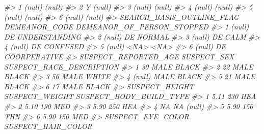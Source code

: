 \documentclass[
]{krantz}
\makeatletter
\newenvironment{Shaded}{\begin{snugshade}}{\end{snugshade}}
\newcommand{\CommentTok}[1]{\textcolor[rgb]{0.37,0.37,0.37}{\textit{#1}}}
\newenvironment{kframe}{%
\medskip{}
\setlength{\fboxsep}{.8em}
 \def\at@end@of@kframe{}%
 \ifinner\ifhmode%
  \def\at@end@of@kframe{\end{minipage}}%
  \begin{minipage}{\columnwidth}%
 \fi\fi%
 \def\FrameCommand##1{\hskip\@totalleftmargin \hskip-\fboxsep
 \colorbox{shadecolor}{##1}\hskip-\fboxsep
     \hskip-\linewidth \hskip-\@totalleftmargin \hskip\columnwidth}%
 \MakeFramed {\advance\hsize-\width
   \@totalleftmargin\z@ \linewidth\hsize
   \@setminipage}}%
 {\par\unskip\endMakeFramed%
 \at@end@of@kframe}
\renewenvironment{Shaded}{\begin{kframe}}{\end{kframe}}
\makeatother
\begin{document}
\begin{Shaded}
\begin{Highlighting}[]
\CommentTok{\#\textgreater{} 1                                 (null)                  (null)}
\CommentTok{\#\textgreater{} 2                                      Y                  (null)}
\CommentTok{\#\textgreater{} 3                                 (null)                  (null)}
\CommentTok{\#\textgreater{} 4                                 (null)                  (null)}
\CommentTok{\#\textgreater{} 5                                 (null)                  (null)}
\CommentTok{\#\textgreater{} 6                                 (null)                  (null)}
\CommentTok{\#\textgreater{}   SEARCH\_BASIS\_OUTLINE\_FLAG DEMEANOR\_CODE DEMEANOR\_OF\_PERSON\_STOPPED}
\CommentTok{\#\textgreater{} 1                    (null)            DE              UNDERSTANDING}
\CommentTok{\#\textgreater{} 2                    (null)            DE                     NORMAL}
\CommentTok{\#\textgreater{} 3                    (null)            DE                       CALM}
\CommentTok{\#\textgreater{} 4                    (null)            DE                   CONFUSED}
\CommentTok{\#\textgreater{} 5                    (null)          \textless{}NA\textgreater{}                       \textless{}NA\textgreater{}}
\CommentTok{\#\textgreater{} 6                    (null)            DE               COORPERATIVE}
\CommentTok{\#\textgreater{}   SUSPECT\_REPORTED\_AGE SUSPECT\_SEX SUSPECT\_RACE\_DESCRIPTION}
\CommentTok{\#\textgreater{} 1                   30        MALE                    BLACK}
\CommentTok{\#\textgreater{} 2                   22        MALE                    BLACK}
\CommentTok{\#\textgreater{} 3                   56        MALE                    WHITE}
\CommentTok{\#\textgreater{} 4               (null)        MALE                    BLACK}
\CommentTok{\#\textgreater{} 5                   21        MALE                    BLACK}
\CommentTok{\#\textgreater{} 6                   17        MALE                    BLACK}
\CommentTok{\#\textgreater{}   SUSPECT\_HEIGHT SUSPECT\_WEIGHT SUSPECT\_BODY\_BUILD\_TYPE}
\CommentTok{\#\textgreater{} 1           5.11            230                     HEA}
\CommentTok{\#\textgreater{} 2           5.10            190                     MED}
\CommentTok{\#\textgreater{} 3           5.90            250                     HEA}
\CommentTok{\#\textgreater{} 4             NA             NA                  (null)}
\CommentTok{\#\textgreater{} 5           5.90            150                     THN}
\CommentTok{\#\textgreater{} 6           5.90            150                     MED}
\CommentTok{\#\textgreater{}   SUSPECT\_EYE\_COLOR SUSPECT\_HAIR\_COLOR}

\end{Highlighting}
\end{Shaded}
\end{document}
